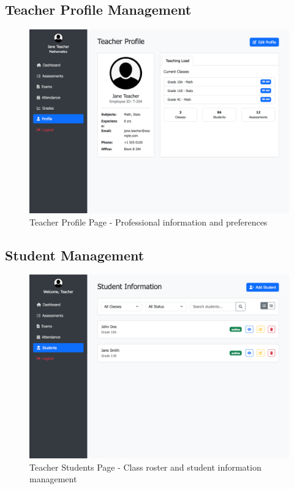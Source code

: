 \documentclass[12pt,a4paper]{article}
\begin{document}
\subsection{Teacher Profile Management}
\begin{figure}[H]
    \centering
    \includegraphics[width=\textwidth]{teacher/teacher-profile-page.png}
    \caption{Teacher Profile Page - Professional information and preferences}
    \label{fig:teacher-profile}
\end{figure}

\subsection{Student Management}
\begin{figure}[H]
    \centering
    \includegraphics[width=\textwidth]{teacher/teacher-students-page.png}
    \caption{Teacher Students Page - Class roster and student information management}
    \label{fig:teacher-students}
\end{figure}
\end{document}
